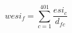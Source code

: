 \documentclass[preview]{standalone}
\begin{document}
  \begin{equation} \tag{1}
    wesi_f=\sum_{c=1}^{401}\frac{esi_c}{d_{fc}}
  \end{equation}
\end{document}
